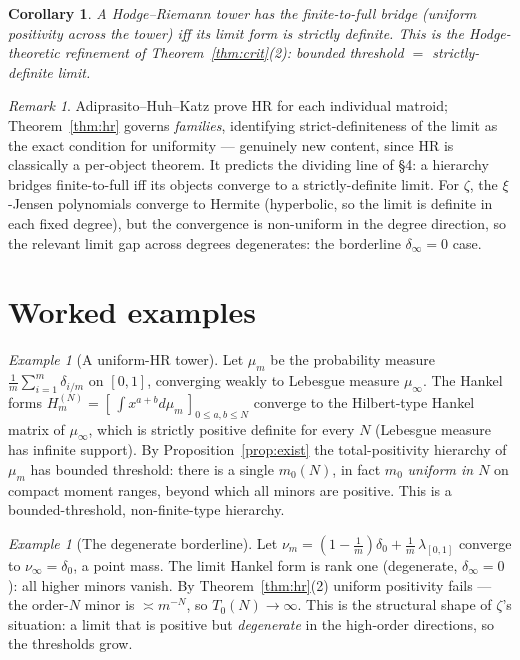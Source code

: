 \documentclass[11pt]{amsart}
\newtheorem{corollary}[theorem]{Corollary}
\theoremstyle{definition}
\theoremstyle{remark}
\newtheorem{remark}[theorem]{Remark}
\newtheorem{example}[theorem]{Example}
\begin{document}
\begin{corollary}\label{cor:towerbridge}
A Hodge--Riemann tower has the finite-to-full bridge (uniform positivity across
the tower) iff its limit form is strictly definite. This is the Hodge-theoretic
refinement of Theorem~\ref{thm:crit}(2): bounded threshold $=$ strictly-definite
limit.
\end{corollary}

\begin{remark}
Adiprasito--Huh--Katz prove HR for each individual matroid; Theorem~\ref{thm:hr}
governs \emph{families}, identifying strict-definiteness of the limit as the exact
condition for uniformity --- genuinely new content, since HR is classically a
per-object theorem. It predicts the dividing line of \S4: a hierarchy bridges
finite-to-full iff its objects converge to a strictly-definite limit. For
$\zeta$, the $\xi$-Jensen polynomials converge to Hermite (hyperbolic, so the
limit is definite in each fixed degree), but the convergence is non-uniform in
the degree direction, so the relevant limit gap across degrees degenerates: the
borderline $\delta_\infty=0$ case.
\end{remark}

\section{Worked examples}
\begin{example}[A uniform-HR tower]\label{ex:def}
Let $\mu_m$ be the probability measure $\tfrac1m\sum_{i=1}^m\delta_{i/m}$ on
$[0,1]$, converging weakly to Lebesgue measure $\mu_\infty$. The Hankel forms
$H_m^{(N)}=[\,\int x^{a+b}d\mu_m\,]_{0\le a,b\le N}$ converge to the Hilbert-type
Hankel matrix of $\mu_\infty$, which is strictly positive definite for every $N$
(Lebesgue measure has infinite support). By Proposition~\ref{prop:exist} the
total-positivity hierarchy of $\mu_m$ has bounded threshold: there is a single
$m_0(N)$, in fact $m_0$ \emph{uniform in $N$} on compact moment ranges, beyond
which all minors are positive. This is a bounded-threshold, non-finite-type
hierarchy.
\end{example}

\begin{example}[The degenerate borderline]\label{ex:deg}
Let $\nu_m=(1-\tfrac1m)\delta_0+\tfrac1m\,\lambda_{[0,1]}$ converge to
$\nu_\infty=\delta_0$, a point mass. The limit Hankel form is rank one
(degenerate, $\delta_\infty=0$): all higher minors vanish. By
Theorem~\ref{thm:hr}(2) uniform positivity fails --- the order-$N$ minor is
$\asymp m^{-N}$, so $T_0(N)\to\infty$. This is the structural shape of $\zeta$'s
situation: a limit that is positive but \emph{degenerate} in the high-order
directions, so the thresholds grow.
\end{example}
\end{document}
